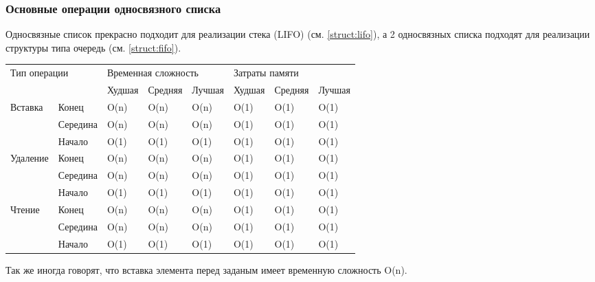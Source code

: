 \subsubsection{Основные операции односвязного списка}
Односвязные список прекрасно подходит для реализации стека (LIFO) (см. \ref{struct:lifo}), а 2 односвязных списка подходят для реализации структуры типа очередь (см. \ref{struct:fifo}). 
\begin{table}[h!]
\begin{tabular}{|l|l|l|l|l|l|l|l|}
\hline
\multicolumn{2}{|l|}{\multirow{2}{*}{Тип операции}} & \multicolumn{3}{l|}{Временная сложность} & \multicolumn{3}{l|}{Затраты памяти} \\ \cline{3-8} 
\multicolumn{2}{|l|}{}                  & Худшая & Средняя & Лучшая & Худшая & Средняя & Лучшая		\\ \hline
\multirow{3}{*}{Вставка}     & Конец 	& O(n) 	 & O(n)    & O(n)   & O(1)   & O(1)    & O(1)		\\ \cline{2-8} 
             & Середина & O(n) 	 & O(n)    & O(n)   & O(1)   & O(1)    & O(1)		\\ \cline{2-8} 
             & Начало 	& O(1) 	 & O(1)    & O(1)   & O(1)   & O(1)    & O(1)		\\ \hline
\multirow{3}{*}{Удаление}    & Конец 	& O(n) 	 & O(n)    & O(n)   & O(1)   & O(1)    & O(1)		\\ \cline{2-8} 
             & Середина & O(n) 	 & O(n)    & O(n)   & O(1)   & O(1)    & O(1)		\\ \cline{2-8} 
             & Начало 	& O(1) 	 & O(1)    & O(1)   & O(1)   & O(1)    & O(1)		\\ \hline
\multirow{3}{*}{Чтение}      & Конец 	& O(n) 	 & O(n)    & O(n)   & O(1)   & O(1)    & O(1)		\\ \cline{2-8} 
             & Середина & O(n) 	 & O(n)    & O(n)   & O(1)   & O(1)    & O(1)		\\ \cline{2-8} 
             & Начало 	& O(1) 	 & O(1)    & O(1)   & O(1)   & O(1)    & O(1)		\\ \hline
			
\end{tabular}
\end{table}

Так же иногда говорят, что вставка элемента перед заданым имеет временную сложность O(n).

